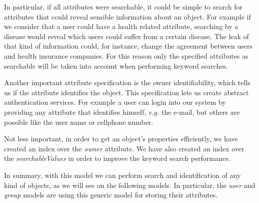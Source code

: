 In particular, if all attributes were searchable, it could be simple to search for attributes that could reveal sensible information about an object. For example if we consider that a user could have a health related attribute, searching by a disease would reveal which users could suffer from a certain disease. The leak of that kind of information could, for instance, change the agreement between users and health insurance companies. For this reason only the specified attributes as searchable will be taken into account when performing keyword searches.

Another important attribute specification is the owner identifiability, which tells us if the attribute identifies the object. This specification lets us create abstract authentication services. For example a user can login into our system by providing any attribute that identifies himself, \emph{e.g.} the e-mail, but others are possible like the user name or cellphone number. 

Not less important, in order to get an object's properties efficiently, we have created an index over the \emph{owner} attribute. We have also created an index over the \emph{searchableValues} in order to improve the keyword search performance.

In summary, with this model we can perform search and identification of any kind of objects, as we will see on the following models. In particular, the \emph{user} and \emph{group} models are using this generic model for storing their attributes. 



